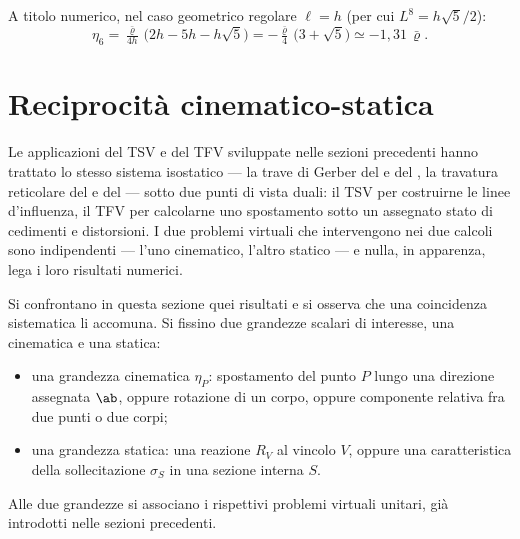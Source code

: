 \begin{esempio}
\begin{svolgimento}
		
		A titolo numerico, nel caso geometrico regolare $\ell = h$ (per
		cui $L^{8} = h\sqrt{5}/2$):
		\begin{equation*}
			\eta_6 = \tfrac{\bar\varrho}{4h}\,
			\bigl(2h - 5h - h\sqrt{5}\bigr)
			= -\tfrac{\bar\varrho}{4}\,\bigl(3 + \sqrt{5}\bigr)
			\simeq -1{,}31\,\bar\varrho.
		\end{equation*}
	\end{svolgimento}
\end{esempio}


\section{Reciprocità cinematico-statica}
\label{sec:reciprocita}

Le applicazioni del TSV e del TFV sviluppate nelle sezioni 
precedenti hanno trattato lo stesso sistema isostatico --- la 
trave di Gerber del  e del 
, la travatura reticolare del 
 e del  
--- sotto due punti di vista duali: il TSV per costruirne le linee 
d'influenza, il TFV per calcolarne uno spostamento sotto un 
assegnato stato di cedimenti e distorsioni. I due problemi virtuali 
che intervengono nei due calcoli sono indipendenti --- l'uno 
cinematico, l'altro statico --- e nulla, in apparenza, lega i 
loro risultati numerici.

Si confrontano in questa sezione quei risultati e si osserva che 
una coincidenza sistematica li accomuna. Si fissino due grandezze 
scalari di interesse, una cinematica e una statica:
\begin{itemize}[noitemsep,topsep=2pt]
	\item una grandezza cinematica $\eta_P$: spostamento del punto 
	$P$ lungo una direzione assegnata $\ab$, oppure rotazione di 
	un corpo, oppure componente relativa fra due punti o due corpi;
	\item una grandezza statica: una reazione $R_V$ al vincolo $V$, 
	oppure una caratteristica della sollecitazione $\sigma_S$ in 
	una sezione interna $S$.
\end{itemize}
Alle due grandezze si associano i rispettivi problemi virtuali 
unitari, già introdotti nelle sezioni precedenti.


